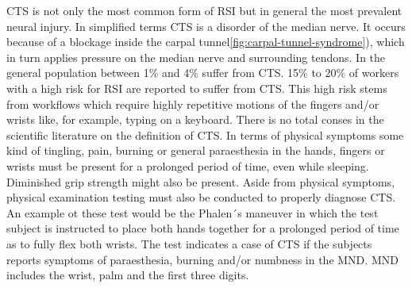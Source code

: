 \gls{CTS} is not only the most common form of \gls{RSI} but in general the most prevalent neural injury\cite{ballestero2017effectiveness}.
In simplified terms \gls{CTS} is a disorder of the median nerve.
It occurs because of a blockage inside the carpal tunnel\ref{fig:carpal-tunnel-syndrome}), which in turn applies pressure on the median nerve and surrounding tendons.
In the general population between 1\% and 4\% suffer from \gls{CTS}\cite{bongers2007carpal}.
15\% to 20\% of workers with a high risk for \gls{RSI} are reported to suffer from \gls{CTS}.
This high risk stems from workflows which require highly repetitive motions of the fingers and/or wrists like, for example, typing on a keyboard.
There is no total conses in the scientific literature on the definition of \gls{CTS}\cite{descatha2011comparison}.
In terms of physical symptoms some kind of tingling, pain, burning or general paraesthesia in the hands, fingers or wrists must be present for a prolonged period of time, even while sleeping.
Diminished grip strength might also be present.
Aside from physical symptoms, physical examination testing must also be conducted to properly diagnose \gls{CTS}.
An example ot these test would be the Phalen´s maneuver in which the test subject is instructed to place both hands together for a prolonged period of time as to fully flex both wrists.
The test indicates a case of \gls{CTS} if the subjects reports symptoms of paraesthesia, burning and/or numbness in the \gls{MND}.
\gls{MND} includes the wrist, palm and the first three digits.

